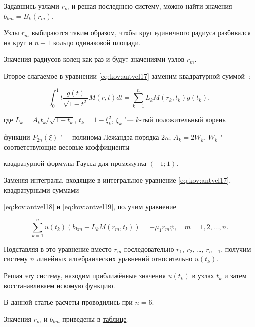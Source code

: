 Задавшись узлами $r_{m}$ и решая последнюю систему, можно найти значения $b_{km}=B_{k}(r_{m})$. 

Узлы $r_{m}$ выбираются таким образом, чтобы круг единичного радиуса разбивался на круг и $n-1$ кольцо одинаковой площади. 

Значения радиусов колец как раз и будут значениями узлов $r_{m}$. 

Второе слагаемое в уравнении \eqref{eq:kov:antvel17} заменим квадратурной суммой~\cite{antvel:bib:VelSteg-ru}:

\begin{equation}

\int_{0}^{1}t \frac{g(t)}{\sqrt{1-t^{2}}}M(r,t)dt=\sum\limits_{k=1}^{n}L_{k}M(r_{k},t_{k})g(t_{k}),

\label{eq:kov:antvel19}

\end{equation}

где $L_{k}={A_{k}t_{k}}/{\sqrt{1+t_{k}}}$, $t_{k}=1-\xi^{2}_{k}$, $\xi_{k}$ "--- $k$-тый положительный корень

функции $P_{2n}(\xi)$ "--- полинома Лежандра порядка $2n$; $A_{k}=2W_{k}$, $W_{k}$ "--- соответствующие весовые коэффициенты

квадратурной формулы Гаусса для промежутка $(-1; 1)$.



Заменяя интегралы, входящие в интегральное уравнение \eqref{eq:kov:antvel17}, квадратурными суммами

\eqref{eq:kov:antvel18} и \eqref{eq:kov:antvel19}, получим уравнение

\begin{equation*}

\sum\limits_{k=1}^{n}u(t_{k})

(b_{km}+L_{k}M(r_{m},t_{k}))=-\mu_{1}r_{m}\psi, \quad  m=1, 2, \ldots, n.

\end{equation*}

Подставляя в это уравнение вместо $r_{m}$ последовательно $r_{1}$, $r_{2}$, \ldots, $r_{n-1}$, получим систему $n$ линейных алгебраических уравнений относительно $u(t_{k})$. 

Решая эту систему, находим приближённые значения $u(t_{k})$ в узлах $t_{k}$ и затем восстанавливаем искомую функцию. 

В данной статье расчеты проводились при $n=6$. 

Значения $r_{m}$ и $b_{km}$ приведены в \hyperlink{anton:table}{таблице}.




